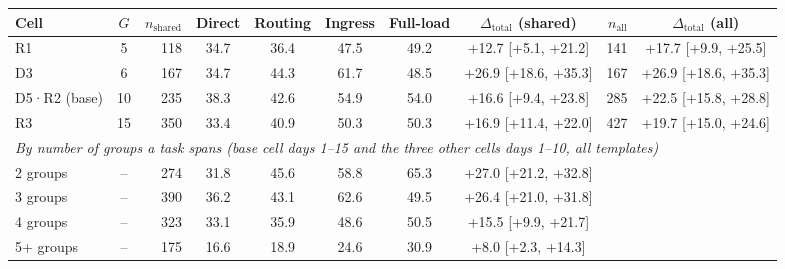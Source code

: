 \begin{tabular}{l c r cccc c r c}
\toprule
Cell & $G$ & $n_{\text{shared}}$ & Direct & Routing & Ingress & Full-load & $\Delta_{\text{total}}$ (shared) & $n_{\text{all}}$ & $\Delta_{\text{total}}$ (all) \\
\midrule
R1 & 5 & 118 & 34.7 & 36.4 & 47.5 & 49.2 & +12.7 [+5.1, +21.2] & 141 & +17.7 [+9.9, +25.5] \\
D3 & 6 & 167 & 34.7 & 44.3 & 61.7 & 48.5 & +26.9 [+18.6, +35.3] & 167 & +26.9 [+18.6, +35.3] \\
D5·R2 (base) & 10 & 235 & 38.3 & 42.6 & 54.9 & 54.0 & +16.6 [+9.4, +23.8] & 285 & +22.5 [+15.8, +28.8] \\
R3 & 15 & 350 & 33.4 & 40.9 & 50.3 & 50.3 & +16.9 [+11.4, +22.0] & 427 & +19.7 [+15.0, +24.6] \\
\midrule
\multicolumn{10}{l}{\textit{By number of groups a task spans (base cell days 1--15 and the three other cells days 1--10, all templates)}} \\
2 groups & -- & 274 & 31.8 & 45.6 & 58.8 & 65.3 & +27.0 [+21.2, +32.8] & & \\
3 groups & -- & 390 & 36.2 & 43.1 & 62.6 & 49.5 & +26.4 [+21.0, +31.8] & & \\
4 groups & -- & 323 & 33.1 & 35.9 & 48.6 & 50.5 & +15.5 [+9.9, +21.7] & & \\
5+ groups & -- & 175 & 16.6 & 18.9 & 24.6 & 30.9 & +8.0 [+2.3, +14.3] & & \\
\bottomrule
\end{tabular}
